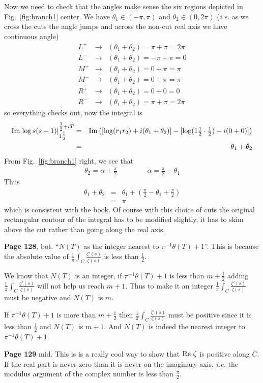 \documentclass[aps,preprint,preprintnumbers,nofootinbib,showpacs,prd]{revtex4-1}
\newcommand{\ie}{{\it i.e.} }
\newcommand{\nbea}{\begin{eqnarray*}}
\newcommand{\neea}{\end{eqnarray*}}
\def\Im{{\rm Im}}
\newcommand{\re}{{\rm Re}}
\begin{document}
Now we need to check that the angles make sense the six regions depicted in Fig.~\ref{fig:branch1} center. We have $\theta_1 \in (-\pi,\pi)$ and $\theta_2 \in (0 , 2\pi)$ (\ie as we cross the cuts the angle jumps and across the non-cut real axis we have continuous angle)
%
\nbea
L^+ & \to & (\theta_1 + \theta_2) = \pi + \pi = 2\pi \\
L^- & \to & (\theta_1 + \theta_2) = -\pi + \pi = 0 \\
M^+ & \to & (\theta_1 + \theta_2) = 0 + \pi = \pi \\
M^- & \to & (\theta_1 + \theta_2) = 0 + \pi = \pi \\
R^+ & \to & (\theta_1 + \theta_2) = 0 + 0 = 0 \\
R^- & \to & (\theta_1 + \theta_2) = \pi + \pi = 2\pi
\neea
%
so everything checks out, now the integral is
%
\nbea
\Im \left. \log s(s-1) \right |_{1\tfrac{1}{2}}^{\tfrac{1}{2} + iT} & = & \Im \left ([\log(r_1r_2) + i (\theta_1 + \theta_2)]  - [\log(1\tfrac{1}{2}\cdot\tfrac{1}{2}) + i (0 + 0) ]\right ) \\
& = & \theta_1 + \theta_2
\neea
%
From Fig.~\ref{fig:branch1} right, we see that
%
\nbea
\theta_2 = \alpha + \tfrac{\pi}{2} ~~~~~~~~~~~~~~~~~~~ \alpha = \tfrac{\pi}{2} - \theta_1
\neea
%
Thus
%
\nbea
\theta_1 + \theta_2 & = & \theta_1 + \left( \tfrac{\pi}{2} - \theta_1 + \tfrac{\pi}{2} \right) \\
& = & \pi
\neea
%
which is consistent with the book. Of course with this choice of cuts the original rectangular contour of the integral has to be modified slightly, it has to skim above the cut rather than going along the real axis.

{\bf Page 128}, bot. ``$N(T)$ as the integer nearest to $\pi^{-1}\theta(T) + 1$''. This is because the absolute value of $\frac{1}{\pi} \int_C \frac{\zeta'(s)}{\zeta(s)}$ is less than $\frac{1}{2}$.

We know that $N(T)$ is an integer, if $\pi^{-1}\theta(T) + 1$ is less than $m + \frac{1}{2}$ adding $\frac{1}{\pi} \int_C \frac{\zeta'(s)}{\zeta(s)}$ will not help us reach $m + 1$. Thus to make it an integer $\frac{1}{\pi} \int_C \frac{\zeta'(s)}{\zeta(s)}$ must be negative and $N(T)$ is $m$.

If $\pi^{-1}\theta(T) + 1$ is more than $m + \frac{1}{2}$ then $\frac{1}{\pi} \int_C \frac{\zeta'(s)}{\zeta(s)}$ must be positive since it is less than $\frac{1}{2}$ and $N(T)$ is $m + 1$. And $N(T)$ is indeed the nearest integer to $\pi^{-1}\theta(T) + 1$.

{\bf Page 129} mid. This is is a really cool way to show that $\re~\zeta$ is positive along $C$. If the real part is never zero than it is never on the imaginary axis, \ie the modulus argument of the complex number is less than $\frac{\pi}{2}$.
\end{document}
